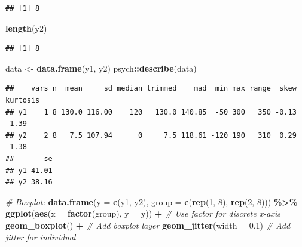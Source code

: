 \documentclass[
]{book}
\newenvironment{Shaded}{\begin{snugshade}}{\end{snugshade}}
\newcommand{\AttributeTok}[1]{\textcolor[rgb]{0.13,0.29,0.53}{#1}}
\newcommand{\CommentTok}[1]{\textcolor[rgb]{0.56,0.35,0.01}{\textit{#1}}}
\newcommand{\DecValTok}[1]{\textcolor[rgb]{0.00,0.00,0.81}{#1}}
\newcommand{\FloatTok}[1]{\textcolor[rgb]{0.00,0.00,0.81}{#1}}
\newcommand{\FunctionTok}[1]{\textcolor[rgb]{0.13,0.29,0.53}{\textbf{#1}}}
\newcommand{\NormalTok}[1]{#1}
\newcommand{\OtherTok}[1]{\textcolor[rgb]{0.56,0.35,0.01}{#1}}
\newcommand{\SpecialCharTok}[1]{\textcolor[rgb]{0.81,0.36,0.00}{\textbf{#1}}}
\begin{document}
\begin{verbatim}
## [1] 8
\end{verbatim}

\begin{Shaded}
\begin{Highlighting}[]
\FunctionTok{length}\NormalTok{(y2)}
\end{Highlighting}
\end{Shaded}

\begin{verbatim}
## [1] 8
\end{verbatim}

\begin{Shaded}
\begin{Highlighting}[]
\NormalTok{data }\OtherTok{\textless{}{-}} \FunctionTok{data.frame}\NormalTok{(y1, y2)}
\NormalTok{psych}\SpecialCharTok{::}\FunctionTok{describe}\NormalTok{(data)}
\end{Highlighting}
\end{Shaded}

\begin{verbatim}
##    vars n  mean     sd median trimmed    mad  min max range  skew kurtosis
## y1    1 8 130.0 116.00    120   130.0 140.85  -50 300   350 -0.13    -1.39
## y2    2 8   7.5 107.94      0     7.5 118.61 -120 190   310  0.29    -1.38
##       se
## y1 41.01
## y2 38.16
\end{verbatim}

\begin{Shaded}
\begin{Highlighting}[]
\CommentTok{\# Boxplot:}
\FunctionTok{data.frame}\NormalTok{(}\AttributeTok{y =} \FunctionTok{c}\NormalTok{(y1, y2), }\AttributeTok{group =} \FunctionTok{c}\NormalTok{(}\FunctionTok{rep}\NormalTok{(}\DecValTok{1}\NormalTok{, }\DecValTok{8}\NormalTok{), }\FunctionTok{rep}\NormalTok{(}\DecValTok{2}\NormalTok{, }\DecValTok{8}\NormalTok{))) }\SpecialCharTok{\%\textgreater{}\%}
  \FunctionTok{ggplot}\NormalTok{(}\FunctionTok{aes}\NormalTok{(}\AttributeTok{x =} \FunctionTok{factor}\NormalTok{(group), }\AttributeTok{y =}\NormalTok{ y)) }\SpecialCharTok{+}  \CommentTok{\# Use factor for discrete x{-}axis}
  \FunctionTok{geom\_boxplot}\NormalTok{() }\SpecialCharTok{+}                        \CommentTok{\# Add boxplot layer}
  \FunctionTok{geom\_jitter}\NormalTok{(}\AttributeTok{width =} \FloatTok{0.1}\NormalTok{)                }\CommentTok{\# Add jitter for individual}
\end{Highlighting}
\end{Shaded}
\end{document}

